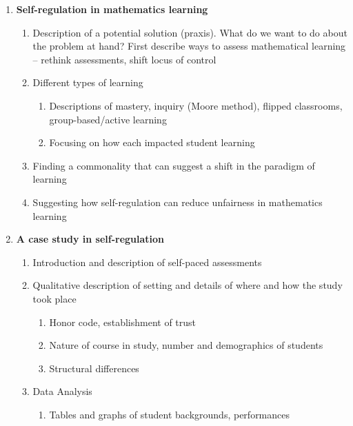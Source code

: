 \begin{enumerate}
\begin{enumerate}
  \end{enumerate}
    \item{\bf Self-regulation in mathematics learning}
    \begin{enumerate}
      \item Description of a potential solution (praxis). What do we want to do about the problem at hand? First describe ways to assess mathematical learning -- rethink assessments, shift locus of control
      \item Different types of learning
      \begin{enumerate}
        \item Descriptions of mastery, inquiry (Moore method), flipped classrooms, group-based/active learning
        \item Focusing on how each impacted student learning
      \end{enumerate}
      \item Finding a commonality that can suggest a shift in the paradigm of learning
      \item Suggesting how self-regulation can reduce unfairness in mathematics learning
    \end{enumerate}
    \item {\bf A case study in self-regulation}
    \begin{enumerate}
      \item Introduction and description of self-paced assessments
      \item Qualitative description of setting and details of where and how the study took place
      \begin{enumerate}
        \item Honor code, establishment of trust
        \item Nature of course in study, number and demographics of students
        \item Structural differences
      \end{enumerate}
      \item Data Analysis
      \begin{enumerate}
        \item Tables and graphs of student backgrounds, performances

\end{enumerate}
\end{enumerate}
\end{enumerate}
